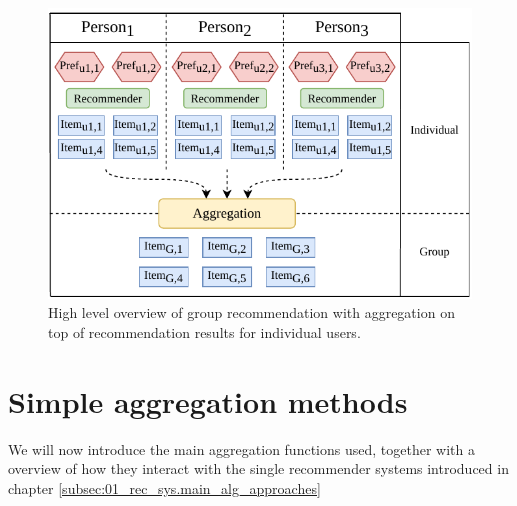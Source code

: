 \begin{figure}[htbp]
    \centering
    \includegraphics{img/after-rec-aggregation.pdf}
    \caption{High level overview of group recommendation with aggregation on top of recommendation results for individual users.}
    \label{fig:after_rec_agg}
\end{figure}



\section{Simple aggregation methods}\label{sec:03_simple_aggregation_metods}
We will now introduce the main aggregation functions used, together with a overview of how they interact with the single recommender systems introduced in chapter \ref{subsec:01_rec_sys.main_alg_approaches}
